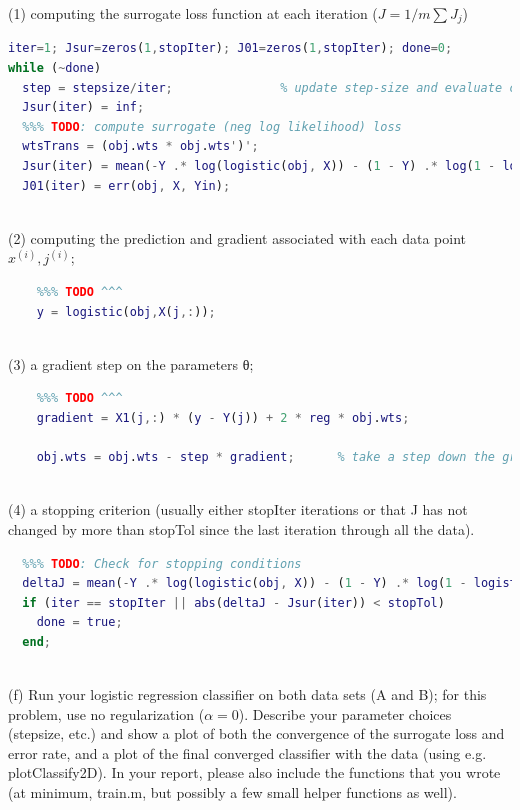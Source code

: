 \documentclass[]{report}   %
\begin{document}
(1) computing the surrogate loss function at each iteration ($J = 1/m\sum J_{j}$)
\begin{lstlisting}[language=Matlab, caption=Calculating surrogate loss at each point.]
iter=1; Jsur=zeros(1,stopIter); J01=zeros(1,stopIter); done=0; 
while (~done) 
  step = stepsize/iter;               % update step-size and evaluate current loss values
  Jsur(iter) = inf;   
  %%% TODO: compute surrogate (neg log likelihood) loss
  wtsTrans = (obj.wts * obj.wts')';
  Jsur(iter) = mean(-Y .* log(logistic(obj, X)) - (1 - Y) .* log(1 - logistic(obj, X)) + reg * sum(wtsTrans));
  J01(iter) = err(obj, X, Yin);
\end{lstlisting}
~\\
(2) computing the prediction and gradient associated with each data point $x^{(i)}, j^{(i)}$;
\begin{lstlisting}[language=Matlab, caption=Compute linear responses and activation for data point j.]
    % Compute linear responses and activation for data point j
    %%% TODO ^^^
    y = logistic(obj,X(j,:));
\end{lstlisting}
~\\
(3) a gradient step on the parameters θ;
\begin{lstlisting}[language=Matlab, caption=Compute gradient.]
    % Compute gradient:
    %%% TODO ^^^
    gradient = X1(j,:) * (y - Y(j)) + 2 * reg * obj.wts;

    obj.wts = obj.wts - step * gradient;      % take a step down the gradient
\end{lstlisting}
~\\
(4) a stopping criterion (usually either stopIter iterations or that J has not changed by more than stopTol since the last iteration through all the data).
\begin{lstlisting}[language=Matlab, caption=Implement stopping criterion.]
  %   done = false;
  %%% TODO: Check for stopping conditions
  deltaJ = mean(-Y .* log(logistic(obj, X)) - (1 - Y) .* log(1 - logistic(obj, X)) + reg * obj.wts * obj.wts');  
  if (iter == stopIter || abs(deltaJ - Jsur(iter)) < stopTol)
    done = true;
  end;
\end{lstlisting}
~\\

(f) Run your logistic regression classifier on both data sets (A and B); for this problem, use no regularization ($\alpha = 0$). Describe your parameter choices (stepsize, etc.) and show a plot of both the convergence of the surrogate loss and error rate, and a plot of the final converged classifier with the data (using e.g. plotClassify2D). In your report, please also include the functions that you wrote (at minimum, train.m, but possibly a few small helper functions as well).
\end{document}
